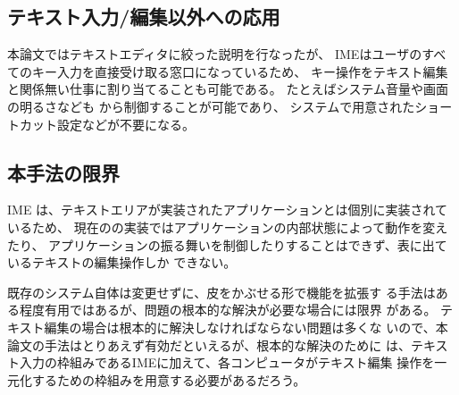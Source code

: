 \subsection{テキスト入力/編集以外への応用}

本論文ではテキストエディタに絞った説明を行なったが、
IMEはユーザのすべてのキー入力を直接受け取る窓口になっているため、
キー操作をテキスト編集と関係無い仕事に割り当てることも可能である。
%
たとえばシステム音量や画面の明るさなども
{\system}から制御することが可能であり、
システムで用意されたショートカット設定などが不要になる。

\subsection{本手法の限界}

IME は、テキストエリアが実装されたアプリケーションとは個別に実装されているため、
現在の{\system}の実装ではアプリケーションの内部状態によって動作を変えたり、
アプリケーションの振る舞いを制御したりすることはできず、表に出ているテキストの編集操作しか
できない。 

%
既存のシステム自体は変更せずに、皮をかぶせる形で機能を拡張す
る手法はある程度有用ではあるが、問題の根本的な解決が必要な場合には限界
がある。
%
テキスト編集の場合は根本的に解決しなければならない問題は多くな
いので、本論文の手法はとりあえず有効だといえるが、根本的な解決のために
は、テキスト入力の枠組みであるIMEに加えて、各コンピュータがテキスト編集
操作を一元化するための枠組みを用意する必要があるだろう。
